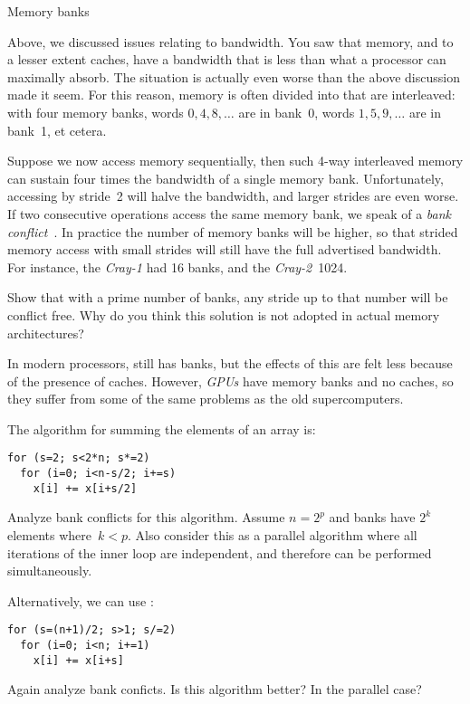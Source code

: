  {Memory banks}
\label{sec:banks}

Above, we discussed issues relating to bandwidth. You saw that memory,
and to a lesser extent caches, have a bandwidth that is less than what
a processor can maximally absorb. The situation is actually even worse
than the above discussion made it seem. For this reason, memory is
often divided into  that are interleaved: with
four memory banks, words $0,4,8,\ldots$ are in bank~0, words
$1,5,9,\ldots$ are in bank~1, et cetera. 

Suppose we now access memory sequentially, then such 4-way interleaved
memory can sustain four times the bandwidth of a single memory
bank. Unfortunately, accessing by stride~2 will halve the bandwidth,
and larger strides are even worse.
%
If two consecutive operations
access the same memory bank, we speak of a
\emph{bank conflict}~\cite{Bailey:conflict}.
%
In practice the number of memory
banks will be higher, so that strided memory access with small strides
will still have the full advertised bandwidth. For instance, the
\emph{Cray-1} had 16 banks, and the
\emph{Cray-2}~1024.

\begin{exercise}
  Show that with a prime number of banks, any stride up to that number
  will be conflict free. Why do you think this solution is not adopted
  in actual memory architectures?
\end{exercise}

In modern processors,  still has banks, but the effects
of this are felt less because of the presence of caches. However,
\emph{GPUs}%
%
have memory banks and no caches,
so they suffer from some of the same problems as the old
supercomputers.

\begin{exercise}
  The  algorithm for summing the
  elements of an array is:
\begin{lstlisting}
for (s=2; s<2*n; s*=2)
  for (i=0; i<n-s/2; i+=s)
    x[i] += x[i+s/2]
\end{lstlisting}
  Analyze bank conflicts for this algorithm. Assume $n=2^p$ and banks
  have $2^k$ elements where~$k<p$. Also consider this as a parallel
  algorithm where all iterations of the inner loop are independent,
  and therefore can be performed
  simultaneously.

  Alternatively, we can use :
\begin{lstlisting}
for (s=(n+1)/2; s>1; s/=2)
  for (i=0; i<n; i+=1)
    x[i] += x[i+s]
\end{lstlisting}
  Again analyze bank conficts. Is this algorithm better? In the
  parallel case?
\end{exercise}

